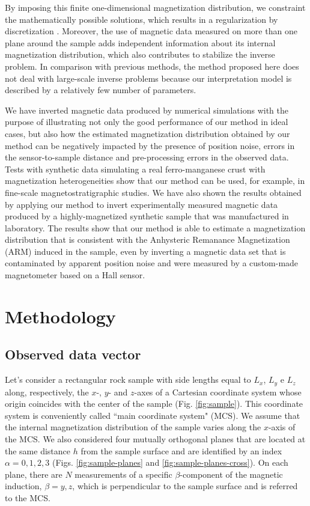\documentclass[draft,gc]{agutex}
\begin{document}
\begin{article}
By imposing this finite one-dimensional magnetization distribution, 
we constraint the mathematically possible solutions, which results
in a regularization by discretization \citep{engl1996, aster2005}.
Moreover, the use of magnetic data measured on more than one
plane around the sample adds independent information about
its internal magnetization distribution, which also contributes
to stabilize the inverse problem.
In comparison with previous methods,
the method proposed here does not deal with large-scale inverse problems 
because our interpretation model is described by a relatively 
few number of parameters.

We have inverted magnetic data produced by
numerical simulations with the purpose of illustrating not only the 
good performance of our method in ideal cases, but also how
the estimated magnetization distribution obtained by our
method can be negatively impacted by the presence of position 
noise, errors in the sensor-to-sample distance and 
pre-processing errors in the observed data.
Tests with synthetic data simulating a real ferro-manganese
crust with magnetization heterogeneities show that our method 
can be used, for example, in fine-scale magnetostratigraphic 
studies.
We have also shown the results obtained by applying our method
to invert experimentally measured magnetic data produced by
a highly-magnetized synthetic sample that was manufactured in 
laboratory.
The results show that our method is able to estimate a magnetization
distribution that is consistent with the Anhysteric Remanance 
Magnetization (ARM) induced in the
sample, even by inverting a magnetic data set that is contaminated 
by apparent position noise and were measured by a
custom-made magnetometer based on a Hall sensor.

\section{Methodology}
\label{sec:Methodology}

\subsection{Observed data vector}
\label{subsec:Observed data vector}


Let's consider a rectangular rock sample with side lengths equal 
to $L_{x}$, $L_{y}$ e $L_{z}$ along, respectively, the $x$-, $y$- and 
$z$-axes of a Cartesian coordinate system 
whose origin coincides with the center of the sample 
(Fig. \ref{fig:sample}). 
This coordinate system is conveniently called 
``main coordinate system" (MCS).
We assume that the internal magnetization distribution of the sample
varies along the $x$-axis of the MCS.
We also considered four mutually orthogonal planes that are located 
at the same distance $h$ from the sample surface and are identified 
by an index $\alpha = 0, 1, 2, 3$
(Figs. \ref{fig:sample-planes} and \ref{fig:sample-planes-cross}).
On each plane, there are $N$ measurements of a specific 
$\beta$-component of the magnetic induction, $\beta = y, z$, 
which is perpendicular to the sample surface and is referred
to the MCS.


\end{article}
\end{document}
